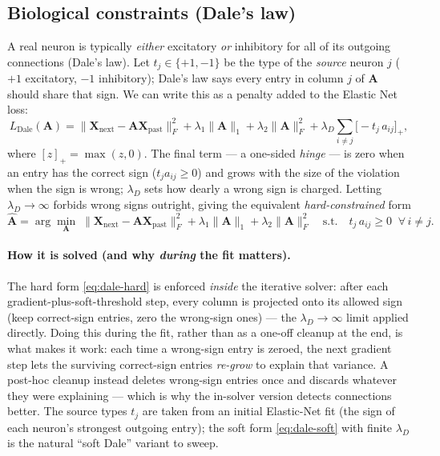 \documentclass[11pt,a4paper]{article}
\newcommand{\Amat}{\mathbf{A}}
\newcommand{\Xp}{\mathbf{X}_{\text{past}}}
\newcommand{\Xn}{\mathbf{X}_{\text{next}}}
\begin{document}
\subsection{Biological constraints (Dale's law)}
A real neuron is typically \emph{either} excitatory \emph{or} inhibitory for all
of its outgoing connections (Dale's law). Let $t_j\in\{+1,-1\}$ be the type of the
\emph{source} neuron $j$ ($+1$ excitatory, $-1$ inhibitory); Dale's law says every
entry in column $j$ of $\Amat$ should share that sign. We can write this as a
penalty added to the Elastic Net loss:
\begin{equation}
L_{\text{Dale}}(\Amat)=
\|\Xn-\Amat\Xp\|_F^2
+\lambda_1\|\Amat\|_1
+\lambda_2\|\Amat\|_F^2
+\lambda_D\!\sum_{i\neq j}\big[-t_j\,a_{ij}\big]_{+},
\label{eq:dale-soft}
\end{equation}
where $[z]_+=\max(z,0)$. The final term --- a one-sided \emph{hinge} --- is zero
when an entry has the correct sign ($t_j a_{ij}\ge 0$) and grows with the size of
the violation when the sign is wrong; $\lambda_D$ sets how dearly a wrong sign is
charged. Letting $\lambda_D\to\infty$ forbids wrong signs outright, giving the
equivalent \emph{hard-constrained} form
\begin{equation}
\widehat{\Amat}=\arg\min_{\Amat}\;
\|\Xn-\Amat\Xp\|_F^2+\lambda_1\|\Amat\|_1+\lambda_2\|\Amat\|_F^2
\quad\text{s.t.}\quad t_j\,a_{ij}\ge 0\;\;\forall\,i\neq j .
\label{eq:dale-hard}
\end{equation}

\paragraph{How it is solved (and why \emph{during} the fit matters).}
The hard form \eqref{eq:dale-hard} is enforced \emph{inside} the iterative solver:
after each gradient-plus-soft-threshold step, every column is projected onto its
allowed sign (keep correct-sign entries, zero the wrong-sign ones) --- the
$\lambda_D\to\infty$ limit applied directly. Doing this during the fit, rather than
as a one-off cleanup at the end, is what makes it work: each time a wrong-sign
entry is zeroed, the next gradient step lets the surviving correct-sign entries
\emph{re-grow} to explain that variance. A post-hoc cleanup instead deletes
wrong-sign entries once and discards whatever they were explaining --- which is why
the in-solver version detects connections better. The source types $t_j$ are taken
from an initial Elastic-Net fit (the sign of each neuron's strongest outgoing
entry); the soft form \eqref{eq:dale-soft} with finite $\lambda_D$ is the natural
``soft Dale'' variant to sweep.
\end{document}
